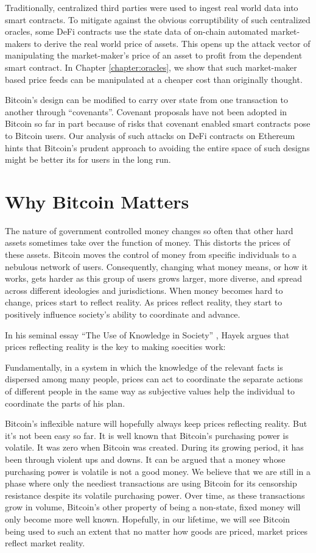 Traditionally, centralized third parties were used to ingest real world data into smart contracts. To mitigate against the obvious corruptibility of such centralized oracles, some DeFi contracts use the state data of on-chain automated market-makers to derive the real world price of assets. This opens up the attack vector of manipulating the market-maker's price of an asset to profit from the dependent smart contract. In Chapter \ref{chapter:oracles}, we show that such market-maker based price feeds can be manipulated at a cheaper cost than originally thought. 

Bitcoin's design can be modified to carry over state from one transaction to another through ``covenants''. Covenant proposals have not been adopted in Bitcoin so far in part because of risks that covenant enabled smart contracts pose to Bitcoin users. Our analysis of such attacks on DeFi contracts on Ethereum hints that Bitcoin's prudent approach to avoiding the entire space of such designs might be better its for users in the long run.

\section{Why Bitcoin Matters}
The nature of government controlled money changes so often that other hard assets sometimes take over the function of money. This distorts the prices of these assets. Bitcoin moves the control of money from specific individuals to a nebulous network of users. Consequently, changing what money means, or how it works, gets harder as this group of users grows larger, more diverse, and spread across different ideologies and jurisdictions. When money becomes hard to change, prices start to reflect reality. As prices reflect reality, they start to positively influence society's ability to coordinate and advance.

In his seminal essay ``The Use of Knowledge in Society'' \cite{Hayek_AER45}, Hayek argues that prices reflecting reality is the key to making soecities work:
\begin{displayquote}
Fundamentally, in a system in which the knowledge of the relevant facts is dispersed among many people, prices can act to coordinate the separate actions of different people in the same way as subjective values help the individual to coordinate the parts of his plan.
\end{displayquote}

Bitcoin's inflexible nature will hopefully always keep prices reflecting reality. But it's not been easy so far. It is well known that Bitcoin's purchasing power is volatile. It was zero when Bitcoin was created. During its growing period, it has been through violent ups and downs. It can be argued that a money whose purchasing power is volatile is not a good money. We believe that we are still in a phase where only the neediest transactions are using Bitcoin for its censorship resistance despite its volatile purchasing power. Over time, as these transactions grow in volume, Bitcoin's other property of being a non-state, fixed money will only become more well known. Hopefully, in our lifetime, we will see Bitcoin being used to such an extent that no matter how goods are priced, market prices reflect market reality.

